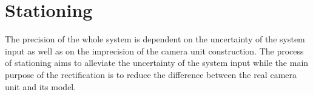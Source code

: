 %
%	
%
%


\vata[20]

\section{Stationing} \label{txt:stationing}

The precision of the whole system is dependent on the uncertainty of the system input as well as on the imprecision of the camera unit construction. The process of stationing aims to alleviate the uncertainty of the system input while the main purpose of the rectification is to reduce the difference between the real camera unit and its model.

